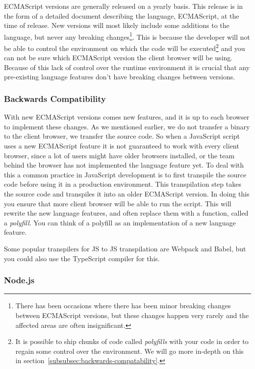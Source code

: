ECMAScript versions are generally released on a yearly basis.
This release is in the form of a detailed document describing the language, ECMAScript, at the time of release.
New versions will most likely include some additions to the language, but never any breaking changes\footnote{There has been occasions where there has been minor breaking changes between ECMAScript versions, but these changes happen very rarely and the affected areas are often insignificant.}.
This is because the developer will not be able to control the environment on which the code will be executed\footnote{It is possible to ship chunks of code called \textit{polyfills} with your code in order to regain some control over the environment. We will go more in-depth on this in section~\vref{subsubsec:backwards-compatability}.} and you can not be sure which ECMAScript version the client browser will be using.
Because of this lack of control over the runtime environment it is crucial that any pre-existing language features don't have breaking changes between versions.

\subsubsection{Backwards Compatibility}\label{subsubsec:backwards-compatability}

With new ECMAScript versions comes new features, and it is up to each browser to implement these changes.
As we mentioned earlier, we do not transfer a binary to the client browser, we transfer the source code.
So when a JavaScript script uses a new ECMAScript feature it is not guaranteed to work with every client browser, since a lot of users might have older browsers installed, or the team behind the browser has not implemented the language feature yet.
To deal with this a common practice in JavaScript development is to first transpile the source code before using it in a production environment.
This transpilation step takes the source code and transpiles it into an older ECMAScript version.
In doing this you ensure that more client browser will be able to run the script.
This will rewrite the new language features, and often replace them with a function, called a \textit{polyfill}.
You can think of a polyfill as an implementation of a new language feature.

Some popular transpilers for JS to JS transpilation are Webpack and Babel, but you could also use the TypeScript compiler for this.

\subsubsection{Node.js}\label{subsubsec:node}

